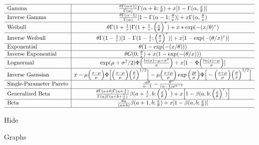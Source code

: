 \documentclass[]{book}
\begin{document}
\[{\begin{matrix}
\begin{array}{l|c}
\hline
  \text{Gamma} & \frac{\theta\Gamma(\alpha+1)}{\Gamma(\alpha)}\Gamma(\alpha+k;\frac{x}{\theta})+x[1-\Gamma(\alpha,\frac{x}{\theta})] \\
\hline
  \text{Inverse Gamma} & \frac{\theta\Gamma(\alpha-1)}{\Gamma(\alpha)}[1-\Gamma(\alpha-1;\frac{\theta}{x})]+x\Gamma(\alpha,\frac{\theta}{x}) \\
\hline
  \text{Weibull} & \theta\Gamma(1+\frac{1}{\tau})\Gamma(1+\frac{1}{\tau},\Big(\frac{x}{\theta}\Big)^\tau)+x*\exp(-(x/\theta)^\tau) \\
\hline
  \text{Inverse Weibull} & \theta\Gamma(1-\frac{1}{\tau})[1-\Gamma(1-\frac{1}{\tau};\Big(\frac{\theta}{x}\Big)^\tau)]+x[1-\exp(-(\theta/x)^\tau)] \\
\hline
  \text{Exponential} & \theta(1-\exp(-(x/\theta))) \\
\hline
  \text{Inverse Exponential} & \theta G(0;\frac{\theta}{x})+x(1-\exp(-(\theta/x))) \\
\hline
  \text{Lognormal} & \exp(\mu+\sigma^2/2)\Phi\Big(\frac{ln(x)-\mu-\sigma^2}{\sigma}\Big)+x[1-\Phi\Big(\frac{ln(x)-\mu}{\sigma}\Big)] \\
\hline
  \text{Inverse Gaussian} & x-\mu\Big(\frac{x-\mu}{\mu}\Big)\Phi\Big[\Big(\frac{x-\mu}{\mu}\Big)\Big(\frac{\theta}{x}\Big)^{1/2}\Big]-\mu\Big(\frac{x+\mu}{\mu}\Big)\exp\Big(\frac{2\theta}{\mu}\Big)\Phi\Big[-\Big(\frac{x+\mu}{\mu}\Big)\Big(\frac{\theta}{x}\Big)^{1/2}\Big] \\
\hline
  \text{Single-Parameter Pareto} & \frac{\alpha\theta}{\alpha-1}-\frac{\theta^\alpha}{(\alpha-1)x^{\alpha-1}} \\
\hline
  \text{Generalized Beta} & \frac{\theta\Gamma(a+b)\Gamma(a+\frac{1}{\tau})}{\Gamma(a)\Gamma(a+b+\frac{1}{\tau})}\beta(a+\frac{1}{\tau},b;\Big(\frac{x}{\theta}\Big)^\tau)+x\Big[1-\beta(a,b;\Big(\frac{x}{\theta}\Big)^\tau)\Big] \\
\hline
  \text{Beta} & \frac{\theta a}{(a+b)}\beta(a+1,b;\frac{x}{\theta})+x[1-\beta(a,b;\frac{x}{\theta})] \\
\hline
\end{array}
\end{matrix}
}
\]

\hypertarget{levB}{}
{Hide}

Graphs
\end{document}
